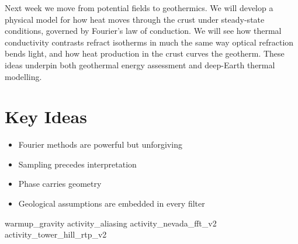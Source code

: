
Next week we move from potential fields to geothermics. We will develop a physical model for how heat moves through the crust under steady-state conditions, governed by Fourier's law of conduction. We will see how thermal conductivity contrasts refract isotherms in much the same way optical refraction bends light, and how heat production in the crust curves the geotherm. These ideas underpin both geothermal energy assessment and deep-Earth thermal modelling.

\section*{Key Ideas}

\begin{itemize}
  \item Fourier methods are powerful but unforgiving
  \item Sampling precedes interpretation
  \item Phase carries geometry
  \item Geological assumptions are embedded in every filter
\end{itemize}

\workshopend

\notepage
\notepage

{warmup_gravity}
{activity_aliasing}
{activity_nevada_fft_v2}
{activity_tower_hill_rtp_v2}
